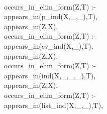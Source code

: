 \documentclass[11pt]{report}
\begin{document}
\begin{sf}
\begin{tabbing}
\\[-0.15ex]
occurs\_\hspace{0.1em}in\_\hspace{0.1em}elim\_\hspace{0.1em}form(Z,T) :- \\[-0.15ex]
\hspace{6em}appears\_\hspace{0.1em}in(p\_\hspace{0.1em}ind(X,\_\hspace{0.1em},\_\hspace{0.1em}),T),\\[-0.15ex]
\hspace{6em}appears\_\hspace{0.1em}in(Z,X).\\[-0.15ex]
occurs\_\hspace{0.1em}in\_\hspace{0.1em}elim\_\hspace{0.1em}form(Z,T) :- \\[-0.15ex]
\hspace{6em}appears\_\hspace{0.1em}in(cv\_\hspace{0.1em}ind(X,\_\hspace{0.1em}),T),\\[-0.15ex]
\hspace{6em}appears\_\hspace{0.1em}in(Z,X).\\[-0.15ex]
occurs\_\hspace{0.1em}in\_\hspace{0.1em}elim\_\hspace{0.1em}form(Z,T) :- \\[-0.15ex]
\hspace{6em}appears\_\hspace{0.1em}in(ind(X,\_\hspace{0.1em},\_\hspace{0.1em},\_\hspace{0.1em}),T),\\[-0.15ex]
\hspace{6em}appears\_\hspace{0.1em}in(Z,X).\\[-0.15ex]
occurs\_\hspace{0.1em}in\_\hspace{0.1em}elim\_\hspace{0.1em}form(Z,T) :- \\[-0.15ex]
\hspace{6em}appears\_\hspace{0.1em}in(list\_\hspace{0.1em}ind(X,\_\hspace{0.1em},\_\hspace{0.1em}),T),\\[-0.15ex]

\end{tabbing}
\end{sf}
\end{document}
